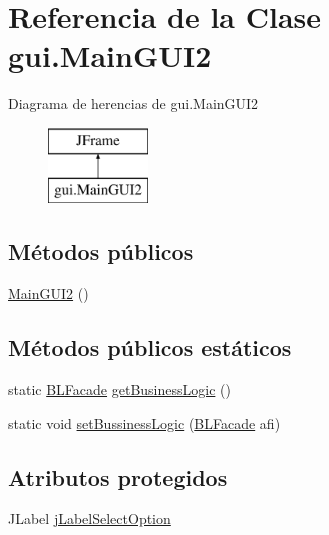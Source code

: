 \hypertarget{classgui_1_1MainGUI2}{}\section{Referencia de la Clase gui.\+Main\+G\+U\+I2}
\label{classgui_1_1MainGUI2}
Diagrama de herencias de gui.\+Main\+G\+U\+I2\begin{figure}[H]
\begin{center}
\leavevmode
\includegraphics[height=2.000000cm]{classgui_1_1MainGUI2}
\end{center}
\end{figure}
\subsection*{Métodos públicos}
\begin{DoxyCompactItemize}
\item 
\mbox{\hyperlink{classgui_1_1MainGUI2_a99317b01dc94f13524250a0fa16bafd8}{Main\+G\+U\+I2}} ()
\end{DoxyCompactItemize}
\subsection*{Métodos públicos estáticos}
\begin{DoxyCompactItemize}
\item 
static \mbox{\hyperlink{interfacebusinessLogic_1_1BLFacade}{B\+L\+Facade}} \mbox{\hyperlink{classgui_1_1MainGUI2_acb0cb9d8f28a8972bf99819a404369f4}{get\+Business\+Logic}} ()
\item 
static void \mbox{\hyperlink{classgui_1_1MainGUI2_ace6c1da32a8c116a6d207f17b446160a}{set\+Bussiness\+Logic}} (\mbox{\hyperlink{interfacebusinessLogic_1_1BLFacade}{B\+L\+Facade}} afi)
\end{DoxyCompactItemize}
\subsection*{Atributos protegidos}
\begin{DoxyCompactItemize}
\item 
J\+Label \mbox{\hyperlink{classgui_1_1MainGUI2_a1b9fd8b3c190d8521e221fe758e3e1df}{j\+Label\+Select\+Option}}
\end{DoxyCompactItemize}
